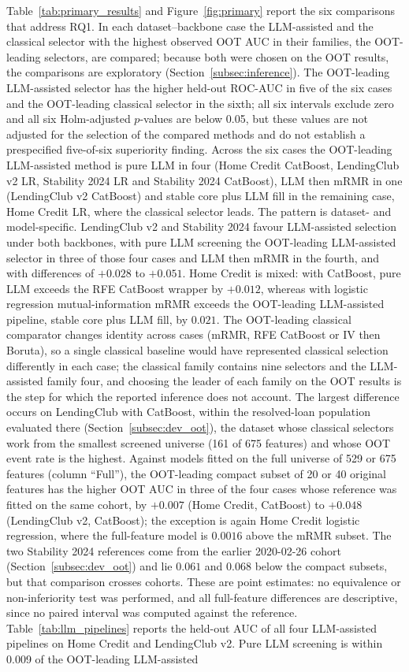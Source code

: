\documentclass[final,5p,twocolumn]{elsarticle}
\begin{document}
Table~\ref{tab:primary_results} and Figure~\ref{fig:primary} report the six comparisons that address RQ1. In each dataset--backbone case the LLM-assisted and the classical selector with the highest observed OOT AUC in their families, the OOT-leading selectors, are compared; because both were chosen on the OOT results, the comparisons are exploratory (Section~\ref{subsec:inference}). The OOT-leading LLM-assisted selector has the higher held-out ROC-AUC in five of the six cases and the OOT-leading classical selector in the sixth; all six intervals exclude zero and all six Holm-adjusted $p$-values are below 0.05, but these values are not adjusted for the selection of the compared methods and do not establish a prespecified five-of-six superiority finding. Across the six cases the OOT-leading LLM-assisted method is pure LLM in four (Home Credit CatBoost, LendingClub v2 LR, Stability 2024 LR and Stability 2024 CatBoost), LLM then mRMR in one (LendingClub v2 CatBoost) and stable core plus LLM fill in the remaining case, Home Credit LR, where the classical selector leads. The pattern is dataset- and model-specific. LendingClub v2 and Stability 2024 favour LLM-assisted selection under both backbones, with pure LLM screening the OOT-leading LLM-assisted selector in three of those four cases and LLM then mRMR in the fourth, and with differences of $+0.028$ to $+0.051$. Home Credit is mixed: with CatBoost, pure LLM exceeds the RFE CatBoost wrapper by $+0.012$, whereas with logistic regression mutual-information mRMR exceeds the OOT-leading LLM-assisted pipeline, stable core plus LLM fill, by $0.021$. The OOT-leading classical comparator changes identity across cases (mRMR, RFE CatBoost or IV then Boruta), so a single classical baseline would have represented classical selection differently in each case; the classical family contains nine selectors and the LLM-assisted family four, and choosing the leader of each family on the OOT results is the step for which the reported inference does not account. The largest difference occurs on LendingClub with CatBoost, within the resolved-loan population evaluated there (Section~\ref{subsec:dev_oot}), the dataset whose classical selectors work from the smallest screened universe (161 of 675 features) and whose OOT event rate is the highest. Against models fitted on the full universe of 529 or 675 features (column ``Full''), the OOT-leading compact subset of 20 or 40 original features has the higher OOT AUC in three of the four cases whose reference was fitted on the same cohort, by $+0.007$ (Home Credit, CatBoost) to $+0.048$ (LendingClub v2, CatBoost); the exception is again Home Credit logistic regression, where the full-feature model is $0.0016$ above the mRMR subset. The two Stability 2024 references come from the earlier 2020-02-26 cohort (Section~\ref{subsec:dev_oot}) and lie $0.061$ and $0.068$ below the compact subsets, but that comparison crosses cohorts. These are point estimates: no equivalence or non-inferiority test was performed, and all full-feature differences are descriptive, since no paired interval was computed against the reference. Table~\ref{tab:llm_pipelines} reports the held-out AUC of all four LLM-assisted pipelines on Home Credit and LendingClub v2. Pure LLM screening is within 0.009 of the OOT-leading LLM-assisted 
\end{document}
